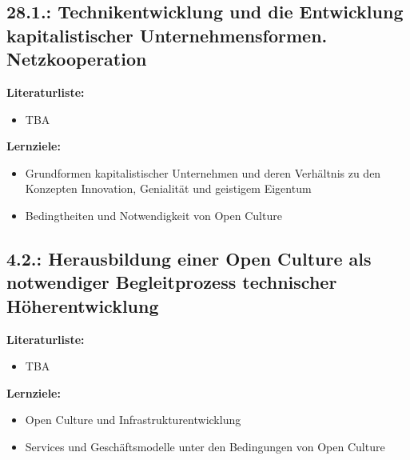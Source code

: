 \documentclass[11pt,a4paper]{article}
\begin{document}
\subsection{28.1.: Technikentwicklung und die Entwicklung kapitalistischer
  Unternehmensformen. Netzkooperation} 

\textbf{Literaturliste:}
\begin{itemize}
\item TBA
\end{itemize}

\textbf{Lernziele:}
\begin{itemize}[noitemsep]
\item Grundformen kapitalistischer Unternehmen und deren Verhältnis zu den
  Konzepten Innovation, Genialität und geistigem Eigentum
\item Bedingtheiten und Notwendigkeit von Open Culture
\end{itemize}

\subsection{4.2.: Herausbildung einer Open Culture als notwendiger
  Begleitprozess technischer Höherentwicklung} 

\textbf{Literaturliste:}
\begin{itemize}
\item TBA
\end{itemize}

\textbf{Lernziele:}
\begin{itemize}[noitemsep]
\item Open Culture und Infrastrukturentwicklung
\item Services und Geschäftsmodelle unter den Bedingungen von Open Culture
\end{itemize}
\end{document}
